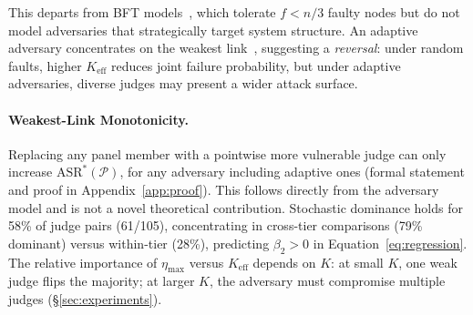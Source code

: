 This departs from BFT models~\cite{lamport1982byzantine,castro1999practical}, which tolerate $f < n/3$ faulty nodes but do not model adversaries that strategically target system structure. An adaptive adversary concentrates on the weakest link~\cite{schneier2000secrets}, suggesting a \emph{reversal}: under random faults, higher $K_{\mathrm{eff}}$ reduces joint failure probability, but under adaptive adversaries, diverse judges may present a wider attack surface.

\paragraph{Weakest-Link Monotonicity.}
\label{thm:monotonicity}
Replacing any panel member with a pointwise more vulnerable judge can only increase $\mathrm{ASR}^*(\mathcal{P})$, for any adversary including adaptive ones (formal statement and proof in Appendix~\ref{app:proof}). This follows directly from the adversary model and is not a novel theoretical contribution. Stochastic dominance holds for 58\% of judge pairs (61/105), concentrating in cross-tier comparisons (79\% dominant) versus within-tier (28\%), predicting $\beta_2 > 0$ in Equation~\ref{eq:regression}. The relative importance of $\eta_{\max}$ versus $K_{\mathrm{eff}}$ depends on $K$: at small $K$, one weak judge flips the majority; at larger $K$, the adversary must compromise multiple judges (\S\ref{sec:experiments}).


